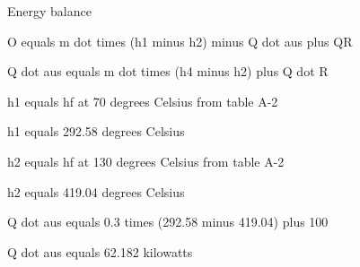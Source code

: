Energy balance

O equals m dot times (h1 minus h2) minus Q dot aus plus QR

Q dot aus equals m dot times (h4 minus h2) plus Q dot R

h1 equals hf at 70 degrees Celsius from table A-2

h1 equals 292.58 degrees Celsius

h2 equals hf at 130 degrees Celsius from table A-2

h2 equals 419.04 degrees Celsius

Q dot aus equals 0.3 times (292.58 minus 419.04) plus 100

Q dot aus equals 62.182 kilowatts